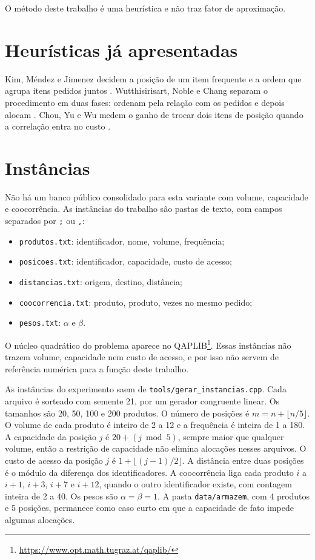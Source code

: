 \documentclass[conference,a4paper]{IEEEtran}
\begin{document}
O método deste trabalho é uma heurística e não traz fator de aproximação.

\section{Heurísticas já apresentadas}
Kim, Méndez e Jimenez decidem a posição de um item frequente e a ordem que agrupa itens pedidos juntos \cite{kim2020}.
Wutthisirisart, Noble e Chang separam o procedimento em duas fases: ordenam pela relação com os pedidos e depois alocam \cite{wutthisirisart2015}.
Chou, Yu e Wu medem o ganho de trocar dois itens de posição quando a correlação entra no custo \cite{chou2023}.

\section{Instâncias}
Não há um banco público consolidado para esta variante com volume, capacidade e coocorrência.
As instâncias do trabalho são pastas de texto, com campos separados por \texttt{;} ou \texttt{,}:
\begin{itemize}
\item \texttt{produtos.txt}: identificador, nome, volume, frequência;
\item \texttt{posicoes.txt}: identificador, capacidade, custo de acesso;
\item \texttt{distancias.txt}: origem, destino, distância;
\item \texttt{coocorrencia.txt}: produto, produto, vezes no mesmo pedido;
\item \texttt{pesos.txt}: \(\alpha\) e \(\beta\).
\end{itemize}
O núcleo quadrático do problema aparece no QAPLIB\footnote{\url{https://www.opt.math.tugraz.at/qaplib/}}.
Essas instâncias não trazem volume, capacidade nem custo de acesso, e por isso não servem de referência numérica para a função deste trabalho.

As instâncias do experimento saem de \texttt{tools/gerar\_instancias.cpp}.
Cada arquivo é sorteado com semente 21, por um gerador congruente linear.
Os tamanhos são 20, 50, 100 e 200 produtos.
O número de posições é \(m = n + \lfloor n/5 \rfloor\).
O volume de cada produto é inteiro de 2 a 12 e a frequência é inteira de 1 a 180.
A capacidade da posição \(j\) é \(20 + (j \bmod 5)\), sempre maior que qualquer volume, então a restrição de capacidade não elimina alocações nesses arquivos.
O custo de acesso da posição \(j\) é \(1 + \lfloor (j-1)/2 \rfloor\).
A distância entre duas posições é o módulo da diferença dos identificadores.
A coocorrência liga cada produto \(i\) a \(i+1\), \(i+3\), \(i+7\) e \(i+12\), quando o outro identificador existe, com contagem inteira de 2 a 40.
Os pesos são \(\alpha = \beta = 1\).
A pasta \texttt{data/armazem}, com 4 produtos e 5 posições, permanece como caso curto em que a capacidade de fato impede algumas alocações.
\end{document}
